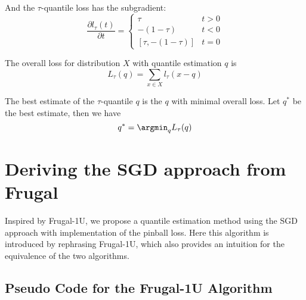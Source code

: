 And the $\tau$-quantile loss has the {\color{red} subgradient}:
%
%
\begin{equation}
    \frac {\partial l_\tau(t)}{\partial t}= 
        \begin{cases}
            \tau                & t > 0\\
            -(1-\tau)           & t < 0\\
            [\tau, -(1 - \tau)] & t = 0
        \end{cases}
\end{equation}



The overall loss for distribution $X$ with quantile estimation $q$ is%
%
\begin{equation}
    L_{\tau}(q) = \sum_{x \in X} l_{\tau}(x - q)
\end{equation}


The best estimate of the $\tau$-quantile $q$ is the $q$ with minimal overall loss. 
Let $q^\ast$ be the best estimate, then we have
\begin{equation}
    q^\ast = \argmin_{q} L_{\tau}(q)
\end{equation}



\section{Deriving the SGD approach from Frugal}
\label{sec: derive_sgd}
Inspired by Frugal-1U\cite{maFrugalStreamingEstimating2014}, we propose a quantile estimation method using the SGD approach with implementation of the pinball loss. Here this algorithm is introduced by rephrasing Frugal-1U, which also provides an intuition for the equivalence of the two algorithms.

\subsection{Pseudo Code for the Frugal-1U Algorithm}

